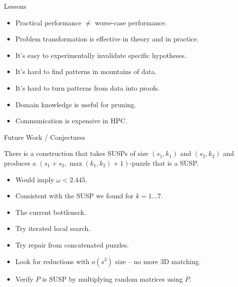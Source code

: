\documentclass[t,10pt,
mathserif,xcolor=dvipsnames]{beamer}
\begin{document}
\begin{myframe}{Lessons}

  \begin{itemize}
  \item Practical performance $\neq$ worse-case performance.
  \item Problem transformation is effective in theory and in practice.
  \item It's easy to experimentally invalidate specific hypotheses.
  \item It's hard to find patterns in mountains of data.  
  \item It's hard to turn patterns from data into proofs.
  \item Domain knowledge is useful for pruning.
  \item Communication is expensive in HPC. 
  \end{itemize}
  
\end{myframe}

\begin{myframe}{Future Work / Conjectures}

  \begin{conj}
    There is a construction that takes SUSPs of size $(s_1,k_1)$ and
    $(s_2,k_2)$ and produces a $(s_1+s_2,\max(k_1,k_2)+1)$-puzzle that
    is a SUSP.
  \end{conj}
  \begin{itemize}
  \item Would imply $\omega < 2.445$.
  \item Consistent with the SUSP we found for $k = 1\ldots 7$.
  \end{itemize}

  \begin{itemize}
  \item The current bottleneck.
  \item Try iterated local search.
  \item Try repair from concatenated puzzles.
  \end{itemize}


  \begin{itemize}
  \item Look for reductions with $o(s^3)$ size -- no more 3D matching.
  \item Verify $P$ is SUSP by multiplying random matrices using $P$.
  \end{itemize}
  
  
\end{myframe}
\end{document}
